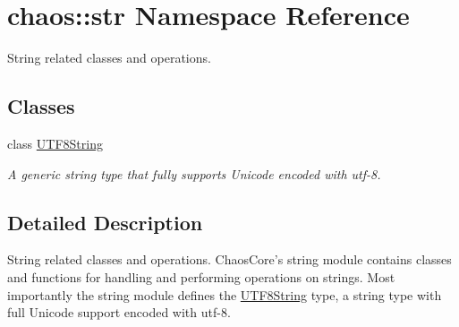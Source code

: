 \hypertarget{namespacechaos_1_1str}{\section{chaos\-:\-:str Namespace Reference}
\label{namespacechaos_1_1str}
}


String related classes and operations.  


\subsection*{Classes}
\begin{DoxyCompactItemize}
\item 
class \hyperlink{classchaos_1_1str_1_1_u_t_f8_string}{U\-T\-F8\-String}
\begin{DoxyCompactList}\small\item\em A generic string type that fully supports Unicode encoded with utf-\/8. \end{DoxyCompactList}\end{DoxyCompactItemize}


\subsection{Detailed Description}
String related classes and operations. Chaos\-Core's string module contains classes and functions for handling and performing operations on strings. Most importantly the string module defines the \hyperlink{classchaos_1_1str_1_1_u_t_f8_string}{U\-T\-F8\-String} type, a string type with full Unicode support encoded with utf-\/8. 